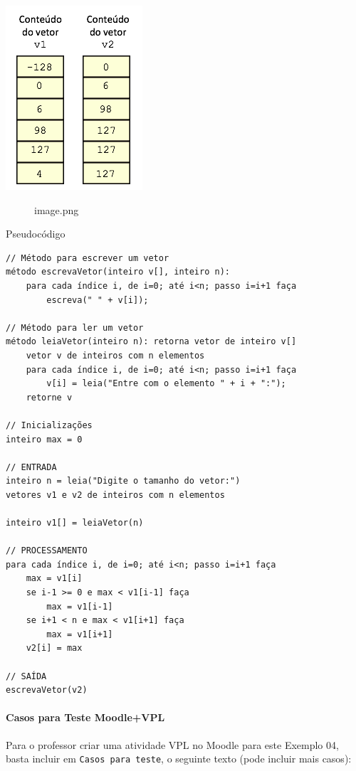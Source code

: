 \documentclass[12pt,a4paper]{article}
\begin{document}
\includegraphics{"figs/image35.png"}

    \begin{figure}
\centering
\caption{image.png}
\end{figure}

    Pseudocódigo

\begin{verbatim}
// Método para escrever um vetor
método escrevaVetor(inteiro v[], inteiro n):
    para cada índice i, de i=0; até i<n; passo i=i+1 faça
        escreva(" " + v[i]);

// Método para ler um vetor
método leiaVetor(inteiro n): retorna vetor de inteiro v[]
    vetor v de inteiros com n elementos
    para cada índice i, de i=0; até i<n; passo i=i+1 faça
        v[i] = leia("Entre com o elemento " + i + ":");
    retorne v

// Inicializações
inteiro max = 0

// ENTRADA
inteiro n = leia("Digite o tamanho do vetor:")
vetores v1 e v2 de inteiros com n elementos

inteiro v1[] = leiaVetor(n)

// PROCESSAMENTO
para cada índice i, de i=0; até i<n; passo i=i+1 faça
    max = v1[i]
    se i-1 >= 0 e max < v1[i-1] faça
        max = v1[i-1]
    se i+1 < n e max < v1[i+1] faça
        max = v1[i+1]
    v2[i] = max

// SAÍDA
escrevaVetor(v2)
\end{verbatim}

    \hypertarget{casos-para-teste-moodlevpl}{%
\paragraph{Casos para Teste
Moodle+VPL}\label{casos-para-teste-moodlevpl}}

Para o professor criar uma atividade VPL no Moodle para este Exemplo 04,
basta incluir em \texttt{Casos\ para\ teste}, o seguinte texto (pode
incluir mais casos):
\end{document}
